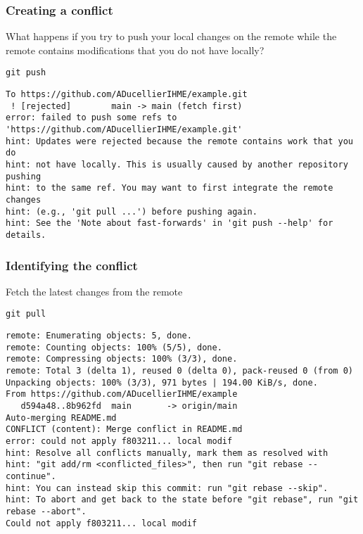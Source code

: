 \documentclass{beamer}
\begin{document}
	\begin{frame}[fragile]
		\frametitle{Creating a conflict}

		What happens if you try to push your local changes on the remote while the remote contains modifications that you do not have locally?

		\begin{exampleblock}{}
		\begin{BVerbatim}
git push
		\end{BVerbatim}
		\end{exampleblock}{}

		\begin{exampleblock}{}
		\begin{tiny}
		\begin{BVerbatim}
To https://github.com/ADucellierIHME/example.git
 ! [rejected]        main -> main (fetch first)
error: failed to push some refs to 'https://github.com/ADucellierIHME/example.git'
hint: Updates were rejected because the remote contains work that you do
hint: not have locally. This is usually caused by another repository pushing
hint: to the same ref. You may want to first integrate the remote changes
hint: (e.g., 'git pull ...') before pushing again.
hint: See the 'Note about fast-forwards' in 'git push --help' for details.
		\end{BVerbatim}
		\end{tiny}
		\end{exampleblock}{}
	\end{frame}

	\begin{frame}[fragile]
		\frametitle{Identifying the conflict}
		
		Fetch the latest changes from the remote

		\begin{exampleblock}{}
		\begin{BVerbatim}
git pull
		\end{BVerbatim}
		\end{exampleblock}{}

		\begin{exampleblock}{}
		\begin{tiny}
		\begin{BVerbatim}
remote: Enumerating objects: 5, done.
remote: Counting objects: 100%
remote: Compressing objects: 100%
remote: Total 3 (delta 1), reused 0 (delta 0), pack-reused 0 (from 0)
Unpacking objects: 100%
From https://github.com/ADucellierIHME/example
   d594a48..8b962fd  main       -> origin/main
Auto-merging README.md
CONFLICT (content): Merge conflict in README.md
error: could not apply f803211... local modif
hint: Resolve all conflicts manually, mark them as resolved with
hint: "git add/rm <conflicted_files>", then run "git rebase --continue".
hint: You can instead skip this commit: run "git rebase --skip".
hint: To abort and get back to the state before "git rebase", run "git rebase --abort".
Could not apply f803211... local modif
		\end{BVerbatim}
		\end{tiny}
		\end{exampleblock}{}		
	\end{frame}
\end{document}
